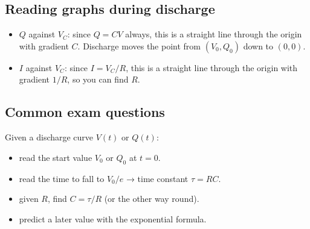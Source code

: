 \documentclass[11pt]{article}
\begin{document}
\subsection*{Reading graphs during discharge}

\begin{itemize}
\item $Q$ against $V_{C}$: since $Q = C V$ always, this is a straight line through the origin with gradient $C$. Discharge moves the point from $(V_{0}, Q_{0})$ down to $(0,0)$.

\item $I$ against $V_{C}$: since $I = V_{C}/R$, this is a straight line through the origin with gradient $1/R$, so you can find $R$.

\end{itemize}

\subsection*{Common exam questions}

Given a discharge curve $V(t)$ or $Q(t)$:

\begin{itemize}
\item read the start value $V_{0}$ or $Q_{0}$ at $t = 0$.

\item read the time to fall to $V_{0}/e$ → time constant $\tau = RC$.

\item given $R$, find $C = \tau / R$ (or the other way round).

\item predict a later value with the exponential formula.

\end{itemize}
\end{document}

